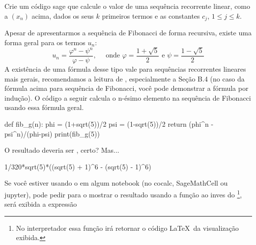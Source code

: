 \begin{exercise} 
  Crie um código sage que calcule o valor de uma
  sequência recorrente linear, como a $(x_n)$ acima,
  dados os seus $k$ primeiros
  termos e as constantes $c_j$, $1\leq j \leq k$.
\end{exercise}

Apesar de apresentarmos a sequência de Fibonacci
de forma recursiva, existe uma forma geral para 
os termos $u_n$:
$$
u_n = \frac{\varphi^n - \psi^n}{\varphi - \psi},\quad
\text{ onde }
\varphi = \frac{1+\sqrt{5}}{2}
\text{ e }
\psi = \frac{1-\sqrt{5}}{2}
$$
A existência de uma fórmula desse tipo vale
para sequências recorrentes lineares mais
gerais, recomendamos a leitura de \cite[Apêndice B]{tnumgugu},
especialmente a Seção B.4 (no caso da fórmula
acima para sequência de Fibonacci, você pode
demonstrar a fórmula por indução).
 O código a seguir
calcula o n-ésimo elemento na sequência de Fibonacci
usando essa fórmula geral.
\begin{sageinput}
def fib_g(n):
    phi = (1+sqrt(5))/2
    psi = (1-sqrt(5))/2
    return (phi^n - psi^n)/(phi-psi)  
print(fib_g(5))
\end{sageinput}
O resultado deveria ser , certo? Mas...

\begin{sageoutput}
1/320*sqrt(5)*((sqrt(5) + 1)^6 - (sqrt(5) - 1)^6)
\end{sageoutput}
Se você estiver usando o \sage em algum notebook
(no cocalc, SageMathCell ou  jupyter), pode pedir
para o \sage mostrar o resultado usando a função
 ao inves do 
\footnote{No interpretador \sage essa
função irá retornar o código \LaTeX\ da
visualização exibida.}, será exibida a expressão

